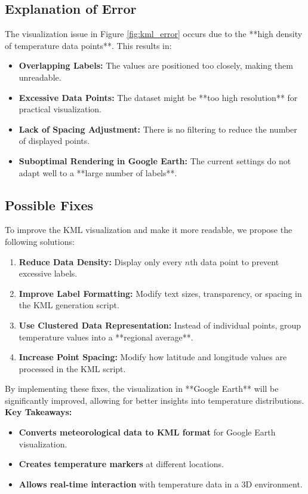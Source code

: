\documentclass[a4paper,10pt]{article}
\begin{document}
\subsection{Explanation of Error}

The visualization issue in Figure \ref{fig:kml_error} occurs due to the **high density of temperature data points**. This results in:
\begin{itemize}
    \item \textbf{Overlapping Labels:} The values are positioned too closely, making them unreadable.
    \item \textbf{Excessive Data Points:} The dataset might be **too high resolution** for practical visualization.
    \item \textbf{Lack of Spacing Adjustment:} There is no filtering to reduce the number of displayed points.
    \item \textbf{Suboptimal Rendering in Google Earth:} The current settings do not adapt well to a **large number of labels**.
\end{itemize}

\subsection{Possible Fixes}

To improve the KML visualization and make it more readable, we propose the following solutions:

\begin{enumerate}
    \item \textbf{Reduce Data Density:} Display only every $n$th data point to prevent excessive labels.
    \item \textbf{Improve Label Formatting:} Modify text sizes, transparency, or spacing in the KML generation script.
    \item \textbf{Use Clustered Data Representation:} Instead of individual points, group temperature values into a **regional average**.
    \item \textbf{Increase Point Spacing:} Modify how latitude and longitude values are processed in the KML script.
\end{enumerate}

By implementing these fixes, the visualization in **Google Earth** will be significantly improved, allowing for better insights into temperature distributions. \\

\textbf{Key Takeaways:}
\begin{itemize}
    \item \textbf{Converts meteorological data to KML format} for Google Earth visualization.
    \item \textbf{Creates temperature markers} at different locations.
    \item \textbf{Allows real-time interaction} with temperature data in a 3D environment.
\end{itemize}
\end{document}
